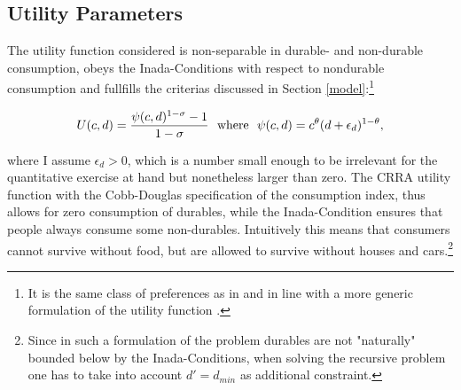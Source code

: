 \documentclass[a4paper,12pt,legno]{article}
\begin{document}
\subsection{Utility Parameters}

The utility function considered is non-separable in durable- and non-durable consumption, obeys the Inada-Conditions with respect to nondurable consumption and fullfills the criterias discussed in Section \ref{model}:\footnote{It is the same class of preferences as in \cite{hintermaier2010} and in line with a more generic formulation of the utility function \citep{FV&K2011}.}

\begin{equation}
U(c,d)=\frac{\psi(c,d)^{1-\sigma}-1}{1-\sigma} \ \ \textnormal{where} \ \ \psi(c,d)=c^{\theta}(d+\epsilon_{d})^{1-\theta},
\end{equation}

where I assume $\epsilon_{d} > 0$, which is a number small enough to be irrelevant for the quantitative exercise at hand but nonetheless larger than zero. The CRRA utility function with the Cobb-Douglas specification of the consumption index, thus allows for zero consumption of durables, while the Inada-Condition ensures that people always consume some non-durables. Intuitively this means that consumers cannot survive without food, but are allowed to survive without houses and cars.\footnote{Since in such a formulation of the problem durables are not "naturally" bounded below by the Inada-Conditions, when solving the recursive problem one has to take into account $d' = d_{min}$ as additional constraint.}
\end{document}
